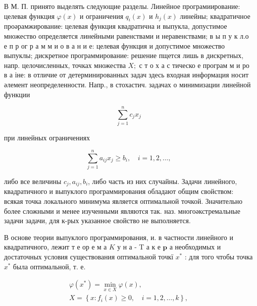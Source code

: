 \documentclass[10pt]{article}
\begin{document}
В М. П. принято выделять следующие разделы. Линейное програмиирование: целевая функция $\varphi(x)$ и ограничения $q_{i}(x)$ и $h_{j}(x)$ линейны; квадратичное проәрамжирование: целевая функция квадратична и выпукла, допустимое множество определяется линейными равенствами и неравенствами; в ы п у к л.о е п р ог р а м м и о в а н и е: целевая функция и допустимое множество выпуклы; дискретное программирование: решение пщется лишь в дискретных, напр. целочисленных, точках множества $X ;$ с т о х а с тическо е програм м и ро в а іне: в отличие от детерминированных задач здесь входная информация носит әлемент неопределенности. Напр., в стохастич. задачах о минимизации линейной функции



\[

\sum_{j=1}^{n} c_{j} x_{j}

\]



при линейных ограничениях



\[

\sum_{j=1}^{n} a_{i j} x_{j} \geqslant b_{i}, \quad i=1,2, \ldots,

\]



либо все величины $c_{j}, a_{i j}, b_{i}$, либо часть из них случайны. Задачи линейного, квадратичного и выпуклого программирования обладают общим свойством: всякая точка локального минимума является оптимальной точкой. Значительно более сложными и менее изученными являются так. наз. многоәкстремальные задачи задачи, для к-рых указанное свойство не выполняется.



В основе теории выпуклого программирования, и. в частности линейного и квадратичного, лежит т е ор е м а $K$ у н а - T а к е $\mathbf{p}$ а необходимых и достаточных условия существования оптимальной точкї $x^{*}$ : для того чтобы точка $x^{*}$ была оптимальной, т. е.



\[

\begin{gathered}

\varphi\left(x^{*}\right)=\min _{x \in X} \varphi(x), \\

X=\left\{x: f_{i}(x) \geqslant 0, \quad i=1,2, \ldots, k\right\},

\end{gathered}

\]
\end{document}
